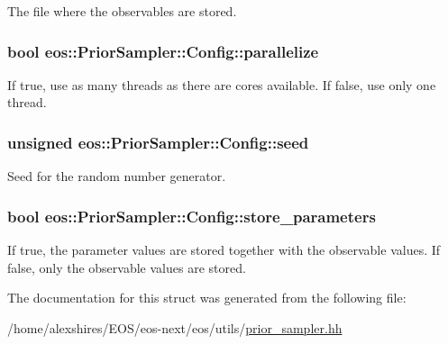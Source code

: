 The file where the observables are stored. \hypertarget{structeos_1_1PriorSampler_1_1Config_ac59ca5849359f3bc11188e7de73c93c2}{
\subsubsection[{parallelize}]{\setlength{\rightskip}{0pt plus 5cm}bool {\bf eos::PriorSampler::Config::parallelize}}}
\label{structeos_1_1PriorSampler_1_1Config_ac59ca5849359f3bc11188e7de73c93c2}
If true, use as many threads as there are cores available. If false, use only one thread. \hypertarget{structeos_1_1PriorSampler_1_1Config_a9f056d7db9c1a40a51520534ab13ee95}{
\subsubsection[{seed}]{\setlength{\rightskip}{0pt plus 5cm}unsigned {\bf eos::PriorSampler::Config::seed}}}
\label{structeos_1_1PriorSampler_1_1Config_a9f056d7db9c1a40a51520534ab13ee95}


Seed for the random number generator. \hypertarget{structeos_1_1PriorSampler_1_1Config_aa572418843b732c559f5b9612d4bf2fa}{
\subsubsection[{store\_\-parameters}]{\setlength{\rightskip}{0pt plus 5cm}bool {\bf eos::PriorSampler::Config::store\_\-parameters}}}
\label{structeos_1_1PriorSampler_1_1Config_aa572418843b732c559f5b9612d4bf2fa}
If true, the parameter values are stored together with the observable values. If false, only the observable values are stored. 

The documentation for this struct was generated from the following file:\begin{DoxyCompactItemize}
\item 
/home/alexshires/EOS/eos-\/next/eos/utils/\hyperlink{prior__sampler_8hh}{prior\_\-sampler.hh}\end{DoxyCompactItemize}
